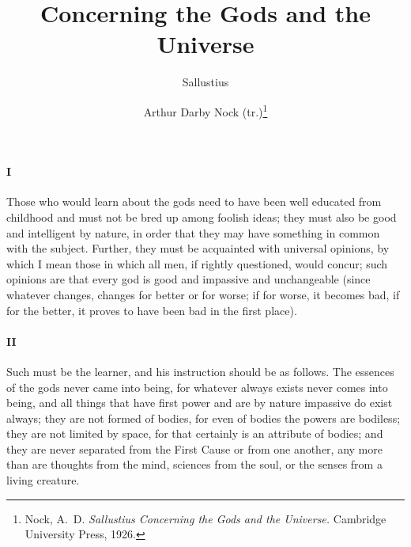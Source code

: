 \documentclass[12pt]{article}
\title{Concerning the Gods and the Universe}
\author{Sallustius \and Arthur Darby Nock (tr.)\footnote{Nock, A.~D. \textit{Sallustius Concerning the Gods and the Universe.} Cambridge University Press, 1926.}}
\date{}
\begin{document}
\maketitle

\paragraph{I} Those who would learn about the gods need to have been well
educated from childhood and must not be bred up among foolish ideas; they must
also be good and intelligent by nature, in order that they may have something
in common with the subject. Further, they must be acquainted with universal
opinions, by which I mean those in which all men, if rightly questioned, would
concur; such opinions are that every god is good and impassive and unchangeable
(since whatever changes, changes for better or for worse; if for worse, it
becomes bad, if for the better, it proves to have been bad in the first place).

\paragraph{II} Such must be the learner, and his instruction should be as
follows. The essences of the gods never came into being, for whatever always
exists never comes into being, and all things that have first power and are by
nature impassive do exist always; they are not formed of bodies, for even of
bodies the powers are bodiless; they are not limited by space, for that
certainly is an attribute of bodies; and they are never separated from the
First Cause or from one another, any more than are thoughts from the mind,
sciences from the soul, or the senses from a living creature.
\end{document}
